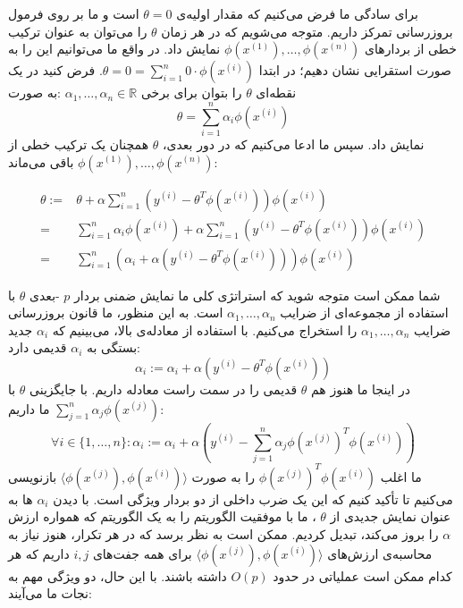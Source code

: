 \documentclass[12pt]{article}
\begin{document}
برای سادگی ما فرض می‌کنیم که مقدار اولیه‌ی
$\theta = 0$
است و ما بر روی فرمول بروزرسانی تمرکز داریم. متوجه می‌شویم که در هر زمان
$\theta$
را می‌توان به عنوان ترکیب خطی از بردارهای
$\phi(x^{(1)}), \ldots, \phi(x^{(n)})$
نمایش داد. در واقع ما می‌توانیم این را به صورت استقرایی نشان دهیم؛ در ابتدا
$\theta = 0 = \sum_{i=1}^{n} 0 \cdot \phi(x^{(i)})$. فرض کنید در یک نقطه‌ای
$\theta$
را بتوان برای برخی
$\alpha_1, \ldots, \alpha_n \in \mathbb{R}$
:به صورت
$$
\theta = \sum_{i=1}^{n} \alpha_i\phi(x^{(i)})
$$
نمایش داد. سپس ما ادعا می‌کنیم که در دور بعدی،
$\theta$
همچنان یک ترکیب خطی از
$\phi(x^{(1)}), \ldots, \phi(x^{(n)})$
باقی می‌ماند:
\begin{center}
\setLR\begin{align*}
\theta := & \theta + \alpha \sum_{i=1}^{n} \left(y^{(i)} - \theta^T\phi(x^{(i)})\right)\phi(x^{(i)}) \\
= & \sum_{i=1}^{n} \alpha_i\phi(x^{(i)}) + \alpha \sum_{i=1}^{n} \left(y^{(i)} - \theta^T\phi(x^{(i)})\right)\phi(x^{(i)}) \\
= & \sum_{i=1}^{n} \left(\alpha_i + \alpha \left(y^{(i)} - \theta^T\phi(x^{(i)})\right)\right)\phi(x^{(i)})
\end{align*}
\end{center}
شما ممکن است متوجه شوید که استراتژی کلی ما نمایش ضمنی بردار
$p$
-بعدی
$\theta$
با استفاده از مجموعه‌ای از ضرایب
$\alpha_1, \ldots, \alpha_n$
است. به این منظور، ما قانون بروزرسانی ضرایب
$\alpha_1, \ldots, \alpha_n$
را استخراج می‌کنیم. با استفاده از معادله‌ی بالا، می‌بینیم که
$\alpha_i$
جدید بستگی به
$\alpha_i$
قدیمی دارد:
$$
\alpha_i := \alpha_i + \alpha \left(y^{(i)} - \theta^T\phi(x^{(i)})\right)
$$
در اینجا ما هنوز هم
$\theta$
قدیمی را در سمت راست معادله داریم. با جایگزینی
$\theta$
با
$\sum_{j=1}^{n} \alpha_j\phi(x^{(j)})$
ما داریم:
$$
\forall i \in \{1, \ldots, n\} : \alpha_i := \alpha_i + \alpha \left(y^{(i)} - \sum_{j=1}^{n} \alpha_j\phi(x^{(j)})^T\phi(x^{(i)})\right)
$$
ما اغلب
$\phi(x^{(j)})^T\phi(x^{(i)})$
را به صورت
$\langle\phi(x^{(j)}),\phi(x^{(i)})\rangle$
بازنویسی می‌کنیم تا تأکید کنیم که این یک ضرب داخلی از دو بردار ویژگی است. با دیدن
$\alpha_i$
ها به عنوان نمایش جدیدی از
$\theta$
، ما با موفقیت الگوریتم
را به یک الگوریتم که همواره ارزش
$\alpha$
را ‌بروز می‌کند، تبدیل کردیم. ممکن است به نظر برسد که در هر تکرار، هنوز نیاز به محاسبه‌ی ارزش‌های
$\langle\phi(x^{(j)}),\phi(x^{(i)})\rangle$
برای همه جفت‌های
$i, j$
داریم که هر کدام ممکن است عملیاتی در حدود
$O(p)$
داشته باشند. با این حال، دو ویژگی مهم به نجات ما می‌آیند:
\end{document}
